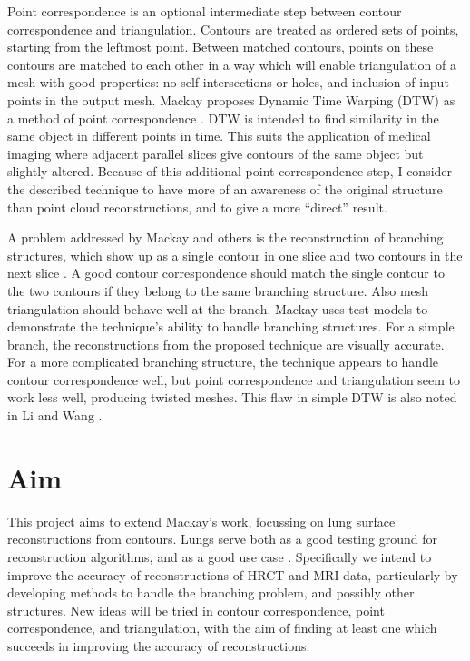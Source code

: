 \documentclass[12pt]{article}
\begin{document}
Point correspondence is an optional intermediate step between contour correspondence and triangulation. Contours are treated as ordered sets of points, starting from the leftmost point. Between matched contours, points on these contours are matched to each other in a way which will enable triangulation of a mesh with good properties: no self intersections or holes, and inclusion of input points in the output mesh. Mackay proposes Dynamic Time Warping (DTW) as a method of point correspondence \cite{mackay2019robust}. DTW is intended to find similarity in the same object in different points in time. This suits the application of medical imaging where adjacent parallel slices give contours of the same object but slightly altered. Because of this additional point correspondence step, I consider the described technique to have more of an awareness of the original structure than point cloud reconstructions, and to give a more “direct” result.

A problem addressed by Mackay and others is the reconstruction of branching structures, which show up as a single contour in one slice and two contours in the next slice \cite{mackay2019robust, akkouche2004implicit}. A good contour correspondence should match the single contour to the two contours if they belong to the same branching structure. Also mesh triangulation should behave well at the branch. Mackay uses test models to demonstrate the technique’s ability to handle branching structures. For a simple branch, the reconstructions from the proposed technique are visually accurate. For a more complicated branching structure, the technique appears to handle contour correspondence well, but point correspondence and triangulation seem to work less well, producing twisted meshes. This flaw in simple DTW is also noted in Li and Wang \cite{li2021method}.

\section{Aim}

This project aims to extend Mackay’s work, focussing on lung surface reconstructions from contours. Lungs serve both as a good testing ground for reconstruction algorithms, and as a good use case \cite{pluta2012new}. Specifically we intend to improve the accuracy of reconstructions of HRCT and MRI data, particularly by developing methods to handle the branching problem, and possibly other structures. New ideas will be tried in contour correspondence, point correspondence, and triangulation, with the aim of finding at least one which succeeds in improving the accuracy of reconstructions. 
\end{document}
